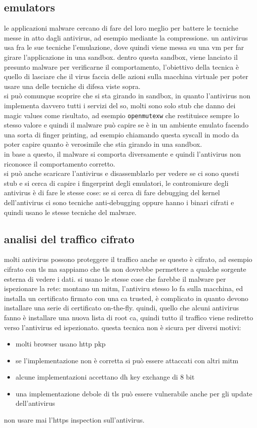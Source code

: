 \documentclass[12pt, oneside]{extbook} %
\begin{document}
\subsection{emulators}
le applicazioni malware cercano di fare del loro meglio per battere le tecniche messe in atto dagli antivirus, ad esempio mediante la compressione. un antivirus usa fra le sue tecniche l'emulazione, dove quindi viene messa su una vm per far girare l'applicazione in una sandbox. dentro questa sandbox, viene lanciato il presunto malware per verificarne il comportamento, l'obiettivo della tecnica è quello di lasciare che il virus faccia delle azioni sulla macchina virtuale per poter usare una delle tecniche di difesa viste sopra.\\si può comunque scoprire che si sta girando in sandbox, in quanto l'antivirus non implementa davvero tutti i servizi del so, molti sono solo stub che danno dei magic values come risultato, ad esempio \texttt{openmutexw} che restituisce sempre lo stesso valore e quindi il malware può capire se è in un ambiente emulato facendo una sorta di finger printing, ad esempio chiamando questa syscall in modo da poter capire quanto è verosimile che stia girando in una sandbox.\\in base a questo, il malware si comporta diversamente e quindi l'antivirus non riconosce il comportamento corretto.\\si può anche scaricare l'antivirus e disassemblarlo per vedere se ci sono questi stub e si cerca di capire i fingerprint degli emulatori, le contromisure degli antivirus è di fare le stesse cose: se si cerca di fare debugging del kernel dell'antivirus ci sono tecniche anti-debugging oppure hanno i binari cifrati e quindi usano le stesse tecniche del malware.

\subsection{analisi del traffico cifrato}
molti antivirus possono proteggere il traffico anche se questo è cifrato, ad esempio cifrato con tls ma sappiamo che tls non dovrebbe permettere a qualche sorgente esterna di vedere i dati. si usano le stesse cose che farebbe il malware per ispezionare la rete: montano un mitm, l'antiviru stesso lo fa sulla macchina, ed installa un certificato firmato con una ca trusted, è complicato in quanto devono installare una serie di certificato on-the-fly. quindi, quello che alcuni antivirus fanno è installare una nuova lista di root ca, quindi tutto il traffico viene rediretto verso l'antivirus ed ispezionato. questa tecnica non è sicura per diversi motivi:
\begin{itemize}
	\item molti browser usano http pkp
	\item se l'implementazione non è corretta si può essere attaccati con altri mitm
	\item alcune implementazioni accettano dh key exchange di 8 bit
	\item una implementazione debole di tls può essere vulnerabile anche per gli update dell'antivirus
\end{itemize}
non usare mai l'https inspection sull'antivirus.
\end{document}
